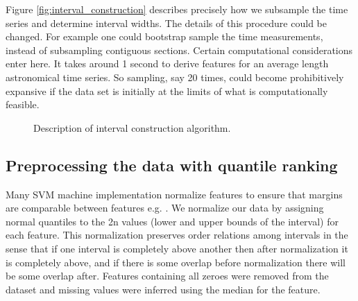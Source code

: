 \documentclass[10pt]{article}
\theoremstyle{definition}
\begin{document}
Figure \ref{fig:interval_construction} describes precisely how we subsample the time series and determine interval widths. The details of this procedure could be changed. For example one could bootstrap sample the time measurements, instead of subsampling contiguous sections. Certain computational considerations enter here. It takes around 1 second to derive features for an average length astronomical time series. So sampling, say 20 times, could become prohibitively expansive if the data set is initially at the limits of what is computationally feasible.
\begin{figure}[ht]
\begin{center}
{\small
{}
}
\end{center}
\caption{Description of interval construction algorithm.\label{fig:interval_construction}}
\label{lb}
\end{figure}

\subsection{Preprocessing the data with quantile ranking}
Many SVM machine implementation normalize features to ensure that margins are comparable between features e.g. \cite{dimitriadou2011package}. We normalize our data by assigning normal quantiles to the 2n values (lower and upper bounds of the interval) for each feature. This normalization preserves order relations among intervals in the sense that if one interval is completely above another then after normalization it is completely above, and if there is some overlap before normalization there will be some overlap after. Features containing all zeroes were removed from the dataset and missing values were inferred using the median for the feature.
\end{document}
